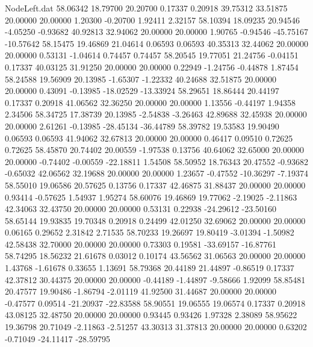 \begin{filecontents}{NodeLeft.dat}
  58.06342   18.79700   20.20700     0.17337    0.20918   39.75312   33.51875   20.00000   20.00000    1.20300   -0.20700    1.92411    2.32157
  58.10394   18.09235   20.94546    -4.05250   -0.93682   40.92813   32.94062   20.00000   20.00000    1.90765   -0.94546  -45.75167  -10.57642
  58.15475   19.46869   21.04614     0.06593    0.06593   40.35313   32.44062   20.00000   20.00000    0.53131   -1.04614    0.74457    0.74457
  58.20545   19.77051   21.24756    -0.04151    0.17337   40.03125   31.91250   20.00000   20.00000    0.22949   -1.24756   -0.44878    1.87454
  58.24588   19.56909   20.13985    -1.65307   -1.22332   40.24688   32.51875   20.00000   20.00000    0.43091   -0.13985  -18.02529  -13.33924
  58.29651   18.86444   20.44197     0.17337    0.20918   41.06562   32.36250   20.00000   20.00000    1.13556   -0.44197    1.94358    2.34506
  58.34725   17.38739   20.13985    -2.54838   -3.26463   42.89688   32.45938   20.00000   20.00000    2.61261   -0.13985  -28.45134  -36.44789
  58.39782   19.53583   19.90490     0.06593    0.06593   41.94062   32.67813   20.00000   20.00000    0.46417    0.09510    0.72625    0.72625
  58.45870   20.74402   20.00559    -1.97538    0.13756   40.64062   32.65000   20.00000   20.00000   -0.74402   -0.00559  -22.18811    1.54508
  58.50952   18.76343   20.47552    -0.93682   -0.65032   42.06562   32.19688   20.00000   20.00000    1.23657   -0.47552  -10.36297   -7.19374
  58.55010   19.06586   20.57625     0.13756    0.17337   42.46875   31.88437   20.00000   20.00000    0.93414   -0.57625    1.54937    1.95274
  58.60076   19.46869   19.77062    -2.19025   -2.11863   42.34063   32.43750   20.00000   20.00000    0.53131    0.22938  -24.29612  -23.50160
  58.65144   19.93835   19.70348     0.20918    0.24499   42.01250   32.69062   20.00000   20.00000    0.06165    0.29652    2.31842    2.71535
  58.70233   19.26697   19.80419    -3.01394   -1.50982   42.58438   32.70000   20.00000   20.00000    0.73303    0.19581  -33.69157  -16.87761
  58.74295   18.56232   21.61678     0.03012    0.10174   43.56562   31.06563   20.00000   20.00000    1.43768   -1.61678    0.33655    1.13691
  58.79368   20.44189   21.44897    -0.86519    0.17337   42.37812   30.44375   20.00000   20.00000   -0.44189   -1.44897   -9.58666    1.92099
  58.85481   20.47577   19.90486    -1.86794   -2.01119   41.92500   31.44687   20.00000   20.00000   -0.47577    0.09514  -21.20937  -22.83588
  58.90551   19.06555   19.06574     0.17337    0.20918   43.08125   32.48750   20.00000   20.00000    0.93445    0.93426    1.97328    2.38089
  58.95622   19.36798   20.71049    -2.11863   -2.51257   43.30313   31.37813   20.00000   20.00000    0.63202   -0.71049  -24.11417  -28.59795

\end{filecontents}
